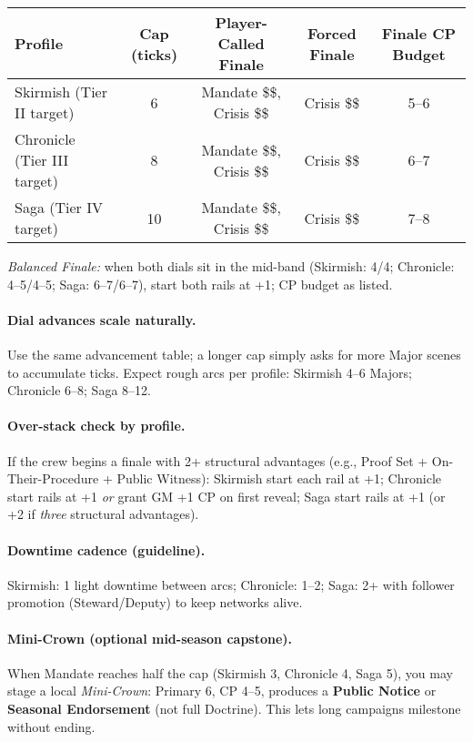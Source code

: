 \documentclass[12pt]{article}
\begin{document}
\begin{center}
\begin{tabular}{@{}l c c c c@{}}
\toprule
\textbf{Profile} & \textbf{Cap (ticks)} & \textbf{Player-Called Finale} & \textbf{Forced Finale} & \textbf{Finale CP Budget} \\
\midrule
Skirmish (Tier II target) & 6 & Mandate \$\ge 5\$, Crisis \$\le 3\$ & Crisis \$\ge 5\$ & 5--6 \\
Chronicle (Tier III target) & 8 & Mandate \$\ge 6\$, Crisis \$\le 3\$ & Crisis \$\ge 6\$ & 6--7 \\
Saga (Tier IV target) & 10 & Mandate \$\ge 8\$, Crisis \$\le 4\$ & Crisis \$\ge 8\$ & 7--8 \n\bottomrule
\end{tabular}
\end{center}

\noindent \textit{Balanced Finale:} when both dials sit in the mid-band (Skirmish: 4/4; Chronicle: 4--5/4--5; Saga: 6--7/6--7), start both rails at +1; CP budget as listed.

\paragraph{Dial advances scale naturally.} Use the same advancement table; a longer cap simply asks for more Major scenes to accumulate ticks. Expect rough arcs per profile: Skirmish 4--6 Majors; Chronicle 6--8; Saga 8--12.

\paragraph{Over-stack check by profile.} If the crew begins a finale with 2+ structural advantages (e.g., Proof Set + On-Their-Procedure + Public Witness): Skirmish start each rail at +1; Chronicle start rails at +1 \emph{or} grant GM +1 CP on first \spadesuit{} reveal; Saga start rails at +1 (or +2 if \emph{three} structural advantages).

\paragraph{Downtime cadence (guideline).} Skirmish: 1 light downtime between arcs; Chronicle: 1--2; Saga: 2+ with follower promotion (Steward/Deputy) to keep networks alive.

\paragraph{Mini-Crown (optional mid-season capstone).} When Mandate reaches half the cap (Skirmish 3, Chronicle 4, Saga 5), you may stage a local \emph{Mini-Crown}: Primary 6, CP 4--5, produces a \textbf{Public Notice} or \textbf{Seasonal Endorsement} (not full Doctrine). This lets long campaigns milestone without ending.
\end{document}
